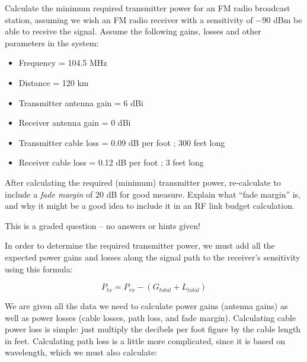 

Calculate the minimum required transmitter power for an FM radio broadcast station, assuming we wish an FM radio receiver with a sensitivity of $-90$ dBm be able to receive the signal.  Assume the following gains, losses and other parameters in the system:

\vskip 10pt

\begin{itemize}
\item{} Frequency = 104.5 MHz
\vskip 10pt
\item{} Distance = 120 km
\vskip 10pt
\item{} Transmitter antenna gain = 6 dBi
\vskip 10pt
\item{} Receiver antenna gain = 0 dBi
\vskip 10pt
\item{} Transmitter cable loss = 0.09 dB per foot ; 300 feet long
\vskip 10pt
\item{} Receiver cable loss = 0.12 dB per foot ; 3 feet long
\end{itemize}

\vskip 10pt

After calculating the required (minimum) transmitter power, re-calculate to include a {\it fade margin} of 20 dB for good measure.  Explain what ``fade margin'' is, and why it might be a good idea to include it in an RF link budget calculation.

\vfil 

\eject






This is a graded question -- no answers or hints given!







In order to determine the required transmitter power, we must add all the expected power gains and losses along the signal path to the receiver's sensitivity using this formula:

$$P_{tx} = P_{rx} - (G_{total} + L_{total})$$

We are given all the data we need to calculate power gains (antenna gains) as well as power losses (cable losses, path loss, and fade margin).  Calculating cable power loss is simple: just multiply the decibels per foot figure by the cable length in feet.  Calculating path loss is a little more complicated, since it is based on wavelength, which we must also calculate:


